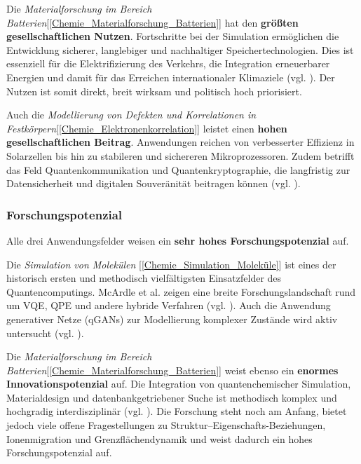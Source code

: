 \vspace{0.5em}

Die \textit{Materialforschung im Bereich Batterien}[\ref{Chemie_Materialforschung_Batterien}] hat den \textbf{größten gesellschaftlichen Nutzen}. Fortschritte bei der Simulation ermöglichen die Entwicklung sicherer, langlebiger und nachhaltiger Speichertechnologien. Dies ist essenziell für die Elektrifizierung des Verkehrs, die Integration erneuerbarer Energien und damit für das Erreichen internationaler Klimaziele (vgl. \cite{demirApplicationQuantumComputing2024}). Der Nutzen ist somit direkt, breit wirksam und politisch hoch priorisiert.

\vspace{0.5em}

Auch die \textit{Modellierung von Defekten und Korrelationen in Festkörpern}[\ref{Chemie_Elektronenkorrelation}] leistet einen \textbf{hohen gesellschaftlichen Beitrag}. Anwendungen reichen von verbesserter Effizienz in Solarzellen bis hin zu stabileren und sichereren Mikroprozessoren. Zudem betrifft das Feld Quantenkommunikation und Quantenkryptographie, die langfristig zur Datensicherheit und digitalen Souveränität beitragen können (vgl. \cite{cao_ab_2023,bassett_quantum_2019}).


\subsubsection{Forschungspotenzial}

Alle drei Anwendungsfelder weisen ein \textbf{sehr hohes Forschungspotenzial} auf.

\vspace{0.5em}

Die \textit{Simulation von Molekülen} [\ref{Chemie_Simulation_Moleküle}] ist eines der historisch ersten und methodisch vielfältigsten Einsatzfelder des Quantencomputings. McArdle et al. zeigen eine breite Forschungslandschaft rund um VQE, QPE und andere hybride Verfahren (vgl. \cite{mcardle_quantum_2020}). Auch die Anwendung generativer Netze (qGANs) zur Modellierung komplexer Zustände wird aktiv untersucht (vgl. \cite{zoufal_quantum_2019}).

\vspace{0.5em}

Die \textit{Materialforschung im Bereich Batterien}[\ref{Chemie_Materialforschung_Batterien}] weist ebenso ein \textbf{enormes Innovationspotenzial} auf. Die Integration von quantenchemischer Simulation, Materialdesign und datenbankgetriebener Suche ist methodisch komplex und hochgradig interdisziplinär (vgl. \cite{urban_computational_2016}). Die Forschung steht noch am Anfang, bietet jedoch viele offene Fragestellungen zu Struktur–Eigenschafts-Beziehungen, Ionenmigration und Grenzflächendynamik und weist dadurch ein hohes Forschungspotenzial auf.

